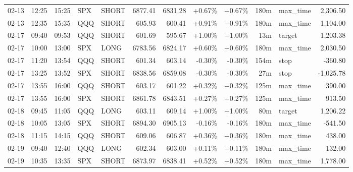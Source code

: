 \documentclass[11pt,a4paper,twoside]{article}
\begin{document}
\begin{center}
\begin{longtable}{>{\color{txtmain}}l l l l l r r r r r >{\color{txtmain}}l r}
02-13 & 12:25 & 15:25 & SPX & SHORT & 6877.41 & 6831.28 & \textcolor{wingreen}{+0.67\%} & \textcolor{wingreen}{+0.67\%} & 180m & max\_time & \textcolor{wingreen}{2,306.50} \\
02-13 & 12:35 & 15:35 & QQQ & SHORT & 605.93 & 600.41 & \textcolor{wingreen}{+0.91\%} & \textcolor{wingreen}{+0.91\%} & 180m & max\_time & \textcolor{wingreen}{1,104.00} \\
02-17 & 09:40 & 09:53 & QQQ & SHORT & 601.69 & 595.67 & \textcolor{wingreen}{+1.00\%} & \textcolor{wingreen}{+1.00\%} & 13m & target & \textcolor{wingreen}{1,203.38} \\
02-17 & 10:00 & 13:00 & SPX & LONG & 6783.56 & 6824.17 & \textcolor{wingreen}{+0.60\%} & \textcolor{wingreen}{+0.60\%} & 180m & max\_time & \textcolor{wingreen}{2,030.50} \\
02-17 & 11:20 & 13:54 & QQQ & SHORT & 601.34 & 603.14 & \textcolor{lossred}{-0.30\%} & \textcolor{lossred}{-0.30\%} & 154m & stop & \textcolor{lossred}{-360.80} \\
02-17 & 13:25 & 13:52 & SPX & SHORT & 6838.56 & 6859.08 & \textcolor{lossred}{-0.30\%} & \textcolor{lossred}{-0.30\%} & 27m & stop & \textcolor{lossred}{-1,025.78} \\
02-17 & 13:55 & 16:00 & QQQ & SHORT & 603.17 & 601.22 & \textcolor{wingreen}{+0.32\%} & \textcolor{wingreen}{+0.32\%} & 125m & max\_time & \textcolor{wingreen}{390.00} \\
02-17 & 13:55 & 16:00 & SPX & SHORT & 6861.78 & 6843.51 & \textcolor{wingreen}{+0.27\%} & \textcolor{wingreen}{+0.27\%} & 125m & max\_time & \textcolor{wingreen}{913.50} \\
02-18 & 09:45 & 11:05 & QQQ & LONG & 603.11 & 609.14 & \textcolor{wingreen}{+1.00\%} & \textcolor{wingreen}{+1.00\%} & 80m & target & \textcolor{wingreen}{1,206.22} \\
02-18 & 10:05 & 13:05 & SPX & SHORT & 6894.30 & 6905.13 & \textcolor{lossred}{-0.16\%} & \textcolor{lossred}{-0.16\%} & 180m & max\_time & \textcolor{lossred}{-541.50} \\
02-18 & 11:15 & 14:15 & QQQ & SHORT & 609.06 & 606.87 & \textcolor{wingreen}{+0.36\%} & \textcolor{wingreen}{+0.36\%} & 180m & max\_time & \textcolor{wingreen}{438.00} \\
02-19 & 09:40 & 12:40 & QQQ & LONG & 602.34 & 603.00 & \textcolor{wingreen}{+0.11\%} & \textcolor{wingreen}{+0.11\%} & 180m & max\_time & \textcolor{wingreen}{132.00} \\
02-19 & 10:35 & 13:35 & SPX & SHORT & 6873.97 & 6838.41 & \textcolor{wingreen}{+0.52\%} & \textcolor{wingreen}{+0.52\%} & 180m & max\_time & \textcolor{wingreen}{1,778.00} \\

\end{longtable}
\end{center}
\end{document}
